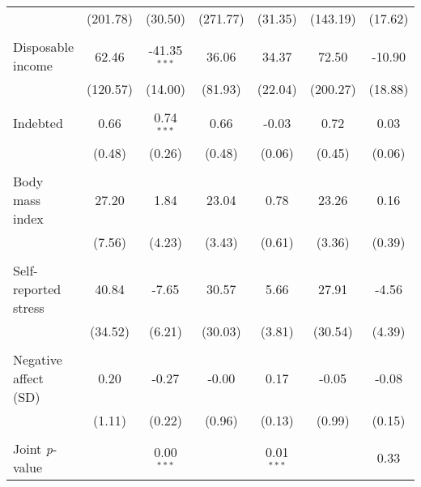 {\begin{tabular}{l*{6}{c}}
          & (201.78)&  (30.50)& (271.77)&  (31.35)& (143.19)&  (17.62)\\
          &         &         &         &         &         &         \\
Disposable income&    62.46&-41.35$^{***}$&    36.06&    34.37&    72.50&   -10.90\\
          & (120.57)&  (14.00)&  (81.93)&  (22.04)& (200.27)&  (18.88)\\
          &         &         &         &         &         &         \\
Indebted  &     0.66&0.74$^{***}$&     0.66&    -0.03&     0.72&     0.03\\
          &   (0.48)&   (0.26)&   (0.48)&   (0.06)&   (0.45)&   (0.06)\\
          &         &         &         &         &         &         \\
Body mass index&    27.20&     1.84&    23.04&     0.78&    23.26&     0.16\\
          &   (7.56)&   (4.23)&   (3.43)&   (0.61)&   (3.36)&   (0.39)\\
          &         &         &         &         &         &         \\
Self-reported stress&    40.84&    -7.65&    30.57&     5.66&    27.91&    -4.56\\
          &  (34.52)&   (6.21)&  (30.03)&   (3.81)&  (30.54)&   (4.39)\\
          &         &         &         &         &         &         \\
Negative affect (SD)&     0.20&    -0.27&    -0.00&     0.17&    -0.05&    -0.08\\
          &   (1.11)&   (0.22)&   (0.96)&   (0.13)&   (0.99)&   (0.15)\\
          &         &         &         &         &         &         \\
\midrule Joint \emph{p}-value&         &0.00$^{***}$&         &0.01$^{***}$&         &     0.33\\
\bottomrule
\end{tabular}
}
